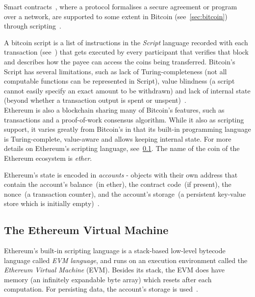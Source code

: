 Smart contracts~\cite{szabo1997smart-contracts}, where a protocol formalises a secure agreement or program over a
network, are supported to some extent in Bitcoin (see~\ref{sec:bitcoin}) through scripting~\cite{bitcoinwiki-scripts}.

A bitcoin script is a list of instructions in the \textit{Script} language recorded with each transaction
(see~) that gets executed by every participant that verifies that block and describes how the
payee can access the coins being transferred.
Bitcoin's Script has several limitations, such as lack of Turing-completeness (not all computable functions can be
represented in Script), value blindness (a script cannot easily specify an exact amount to be
withdrawn) and lack of internal state (beyond whether a transaction output is spent or
unspent)~\cite{buterin2015ethereum}.\\

Ethereum is also a blockchain sharing many of Bitcoin's features, such as transactions and
a proof-of-work consensus algorithm.
While it also as scripting support, it varies greatly from Bitcoin's in that its built-in programming language is
Turing-complete, value-aware and allows keeping internal state.
For more details on Ethereum's scripting language, see~\ref{subsec:eth:contract_langs}.
The name of the coin of the Ethereum ecosystem is \textit{ether}.

Ethereum's state is encoded in \textit{accounts} - objects with their own address that contain the account's
balance~(in ether), the contract code~(if present), the nonce~(a transaction counter), and the account's
storage~(a persistent key-value store which is initially empty)~\cite{buterin2015ethereum}.\\


\subsection{The Ethereum Virtual Machine}\label{subsec:eth:contract_langs}

Ethereum's built-in scripting language is a stack-based low-level bytecode language called
\textit{EVM language}, and runs on an execution environment called the \textit{Ethereum Virtual
Machine} (EVM).
Besides its stack, the EVM does have memory (an infinitely expandable byte array) which resets after
each computation. For persisting data, the account's storage is used~\cite{buterin2015ethereum}. \\

